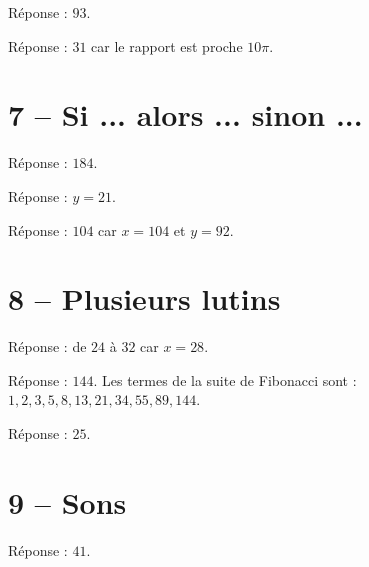 \documentclass[class=report,crop=false, 12pt]{standalone}
\begin{document}
\begin{enigme}
Réponse : $93$.
\end{enigme}

\begin{enigme}
Réponse : $31$ car le rapport est proche $10 \pi$.
\end{enigme}


\section*{7 -- Si ... alors ... sinon ...}

\setcounter{enigme}{0}

\begin{enigme}
Réponse : $184$.
\end{enigme}

\begin{enigme}
Réponse : $y = 21$.
\end{enigme}

\begin{enigme}
Réponse : $104$ car $x = 104$ et $y = 92$.
\end{enigme}


\section*{8 -- Plusieurs lutins}

\setcounter{enigme}{0}

\begin{enigme}
Réponse : de $24$ à $32$ car $x= 28$.
\end{enigme}

\begin{enigme}
Réponse : $144$. Les termes de la suite de Fibonacci sont : $1,2,3,5,8,13,21,34,55,89,144$.
\end{enigme}

\begin{enigme}
Réponse : $25$. 
\end{enigme}


\section*{9 -- Sons}

\setcounter{enigme}{0}

\begin{enigme}
Réponse : $41$.
\end{enigme}
\end{document}
